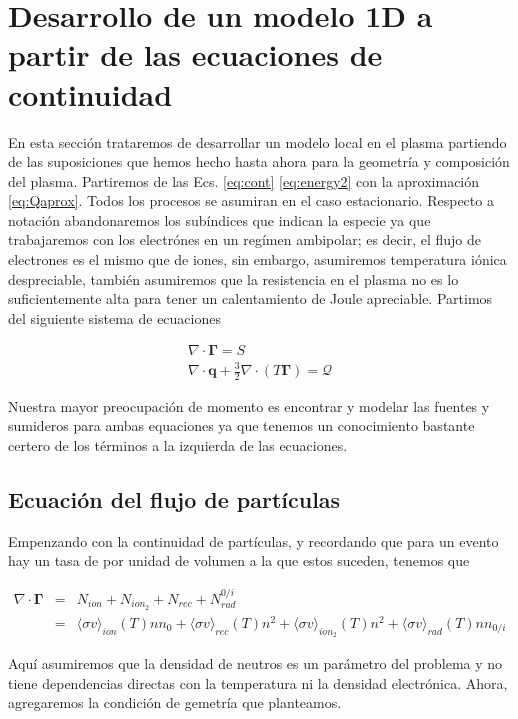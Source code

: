 \section{Desarrollo de un modelo 1D a partir de las ecuaciones de continuidad}

En esta secci\'on trataremos de desarrollar un modelo local en el plasma partiendo de las suposiciones que hemos hecho hasta ahora para la geometr\'ia y composici\'on del plasma. Partiremos de las Ecs. \eqref{eq:cont} \eqref{eq:energy2} con la aproximaci\'on \eqref{eq:Qaprox}. Todos los procesos se asumiran en el caso estacionario. Respecto a notaci\'on abandonaremos los sub\'indices que indican la especie ya que trabajaremos con los electr\'ones en un reg\'imen ambipolar; es decir, el flujo de electrones es el mismo que de iones, sin embargo, asumiremos temperatura i\'onica despreciable, tambi\'en asumiremos que la resistencia en el plasma no es lo suficientemente alta para tener un calentamiento de Joule apreciable. Partimos del siguiente sistema de ecuaciones 

\begin{eqnarray*}
  \nabla\cdot\pmb{\Gamma} = S\\
  \nabla\cdot\textbf{q} + \frac{3}{2}\nabla\cdot(T\pmb{\Gamma}) = \mathcal{Q}
\end{eqnarray*}

Nuestra mayor preocupaci\'on de momento es encontrar y modelar las fuentes y sumideros para ambas equaciones ya que tenemos un conocimiento bastante certero de los t\'erminos a la izquierda de las ecuaciones.

\subsection{Ecuaci\'on del flujo de part\'iculas}

Empenzando con la continuidad de part\'iculas, y recordando que para un evento hay un tasa de por unidad de volumen a la que estos suceden, tenemos que

\begin{eqnarray}
  \nabla\cdot\pmb{\Gamma} &=& N_{ion} + N_{ion_2} + N_{rec} + N_{rad}^{0/i} \nonumber\\
  &=& \langle\sigma v\rangle_{ion}(T)nn_0 + \langle\sigma v\rangle_{rec}(T)n^2 + \langle\sigma v\rangle_{ion_2}(T)n^2 + \langle\sigma v\rangle_{rad}(T)nn_{0/i}\label{eq:contPartsEvents}
\end{eqnarray}

Aqu\'i asumiremos que la densidad de neutros es un par\'ametro del problema y no tiene dependencias directas con la temperatura ni la densidad electr\'onica. Ahora, agregaremos la condici\'on de gemetr\'ia que planteamos. 


